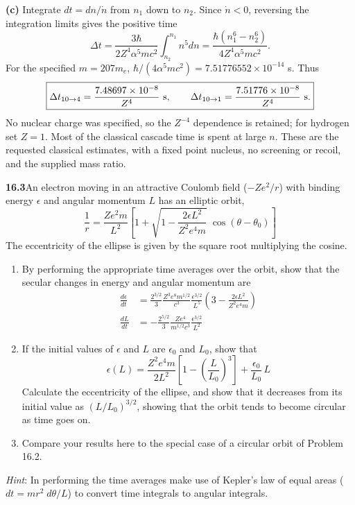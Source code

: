 \textbf{(c)} Integrate $dt=dn/\dot n$ from $n_1$ down to $n_2$.
Since $\dot n<0$, reversing the integration limits gives the positive time
\[
\Delta t=\frac{3\hbar}{2Z^4\alpha^5mc^2}
\int_{n_2}^{n_1}n^5dn
=\boxed{\frac{\hbar(n_1^6-n_2^6)}{4Z^4\alpha^5mc^2}.}
\]
For the specified $m=207m_e$,
$\hbar/(4\alpha^5mc^2)=7.51776552\times10^{-14}$ s. Thus
\[
\boxed{\Delta t_{10\to4}=\frac{7.48697\times10^{-8}}{Z^4}\ {\rm s},
\qquad
\Delta t_{10\to1}=\frac{7.51776\times10^{-8}}{Z^4}\ {\rm s}.}
\]
No nuclear charge was specified, so the $Z^{-4}$ dependence is retained;
for hydrogen set $Z=1$. Most of the classical cascade time is spent
at large $n$. These are the requested classical estimates, with a fixed
point nucleus, no screening or recoil, and the supplied mass ratio.

\par\bigskip
\noindent\textbf{16.3}\quad An electron moving in an attractive Coulomb field ($-Ze^{2}/r$) with binding energy $\epsilon$ and angular momentum $L$ has an elliptic orbit,
\[
\frac{1}{r}=\frac{Ze^{2}m}{L^{2}}\left[1+\sqrt{1-\frac{2\epsilon L^{2}}{Z^{2}e^{4}m}}\;\cos(\theta-\theta_{0})\right]
\]
The eccentricity of the ellipse is given by the square root multiplying the cosine.
\begin{enumerate}
\item[(a)] By performing the appropriate time averages over the orbit, show that the secular changes in energy and angular momentum are
\begin{align*}
\frac{d\epsilon}{dt}&=\frac{2^{3/2}}{3}\frac{Z^{3}e^{8}m^{1/2}}{c^{3}}\frac{\epsilon^{3/2}}{L^{5}}\left(3-\frac{2\epsilon L^{2}}{Z^{2}e^{4}m}\right)\\[4pt]
\frac{dL}{dt}&=-\frac{2^{5/2}}{3}\frac{Ze^{4}}{m^{1/2}c^{3}}\frac{\epsilon^{3/2}}{L^{2}}
\end{align*}
\item[(b)] If the initial values of $\epsilon$ and $L$ are $\epsilon_{0}$ and $L_{0}$, show that
\[
\epsilon(L)=\frac{Z^{2}e^{4}m}{2L^{2}}\left[1-\left(\frac{L}{L_{0}}\right)^{3}\right]+\frac{\epsilon_{0}}{L_{0}}\,L
\]
Calculate the eccentricity of the ellipse, and show that it decreases from its initial value as $(L/L_{0})^{3/2}$, showing that the orbit tends to become circular as time goes on.
\item[(c)] Compare your results here to the special case of a circular orbit of Problem 16.2.
\end{enumerate}
\emph{Hint}: In performing the time averages make use of Kepler's law of equal areas ($dt=mr^{2}\;d\theta/L$) to convert time integrals to angular integrals.
\solution

